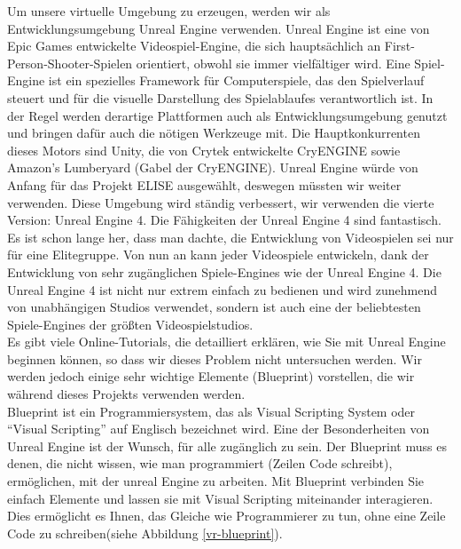 Um unsere virtuelle Umgebung zu erzeugen, werden wir als Entwicklungsumgebung Unreal Engine verwenden. 
Unreal Engine ist eine von Epic Games entwickelte Videospiel-Engine, die sich hauptsächlich an First-Person-Shooter-Spielen orientiert, obwohl sie immer vielfältiger wird. 
Eine Spiel-Engine ist ein spezielles Framework für Computerspiele, das den Spielverlauf steuert und für die visuelle Darstellung des Spielablaufes verantwortlich ist. 
In der Regel werden derartige Plattformen auch als Entwicklungsumgebung genutzt und bringen dafür auch die nötigen Werkzeuge mit. 
Die Hauptkonkurrenten dieses Motors sind Unity, die von Crytek entwickelte CryENGINE sowie Amazon's Lumberyard (Gabel der CryENGINE). 
Unreal Engine würde von Anfang für das Projekt ELISE ausgewählt, deswegen müssten wir weiter verwenden. 
Diese Umgebung wird ständig verbessert, wir verwenden die vierte Version: Unreal Engine 4. 
Die Fähigkeiten der Unreal Engine 4 sind fantastisch. 
Es ist schon lange her, dass man dachte, die Entwicklung von Videospielen sei nur für eine Elitegruppe. 
Von nun an kann jeder Videospiele entwickeln, dank der Entwicklung von sehr zugänglichen Spiele-Engines wie der Unreal Engine 4. 
Die Unreal Engine 4 ist nicht nur extrem einfach zu bedienen und wird zunehmend von unabhängigen Studios verwendet, sondern ist auch eine der beliebtesten Spiele-Engines der größten Videospielstudios. \\

Es gibt viele Online-Tutorials, die detailliert erklären, wie Sie mit Unreal Engine beginnen können, so dass wir dieses Problem nicht untersuchen werden. 
Wir werden jedoch einige sehr wichtige Elemente (Blueprint) vorstellen, die wir während dieses Projekts verwenden werden. \\

Blueprint ist ein Programmiersystem, das als Visual Scripting System oder ``Visual Scripting'' auf Englisch bezeichnet wird. 
Eine der Besonderheiten von Unreal Engine ist der Wunsch, für alle zugänglich zu sein. 
Der Blueprint muss es denen, die nicht wissen, wie man programmiert (Zeilen Code schreibt), ermöglichen, mit der unreal Engine zu arbeiten. 
Mit Blueprint verbinden Sie einfach Elemente und lassen sie mit Visual Scripting miteinander interagieren. 
Dies ermöglicht es Ihnen, das Gleiche wie Programmierer zu tun, ohne eine Zeile Code zu schreiben(siehe Abbildung \ref{vr-blueprint}).\\

